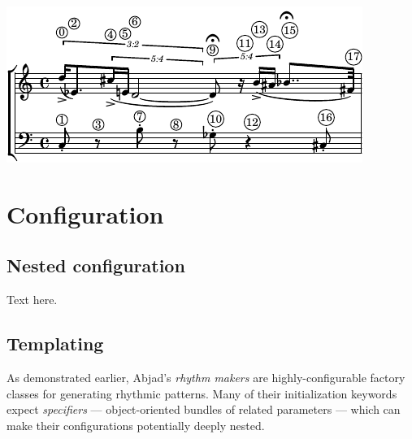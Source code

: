 \documentclass{article}
\begin{document}
\noindent\includegraphics[scale=1.0]{images/abjad-11.pdf}


\section{Configuration} \label{sec:configuration}











\subsection{Nested configuration}

Text here.

\subsection{Templating}

As demonstrated earlier, Abjad's \emph{rhythm makers} are highly-configurable
factory classes for generating rhythmic patterns. Many of their initialization
keywords expect \emph{specifiers} --- object-oriented bundles of related
parameters --- which can make their configurations potentially deeply nested.
\end{document}
